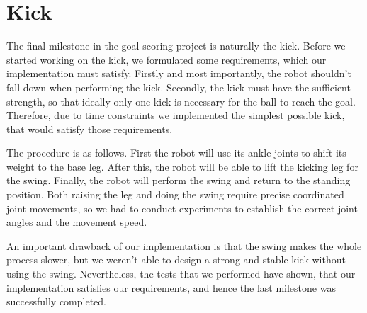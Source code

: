 \section{Kick}

The final milestone in the goal scoring project is naturally the kick. Before
we started working on the kick, we formulated some requirements, which our
implementation must satisfy. Firstly and most importantly, the robot shouldn't
fall down when performing the kick. Secondly, the kick must have the sufficient
strength, so that ideally only one kick is necessary for the ball to reach the
goal. Therefore, due to time constraints we implemented the simplest possible
kick, that would satisfy those requirements.

The procedure is as follows. First the robot will use its ankle joints to shift
its weight to the base leg. After this, the robot will be able to lift the
kicking leg for the swing. Finally, the robot will perform the swing and return
to the standing position. Both raising the leg and doing the swing require
precise coordinated joint movements, so we had to conduct experiments to
establish the correct joint angles and the movement speed.

An important drawback of our implementation is that the swing makes the whole
process slower, but we weren't able to design a strong and stable kick without
using the swing. Nevertheless, the tests that we performed have shown, that our
implementation satisfies our requirements, and hence the last milestone was
successfully completed.

